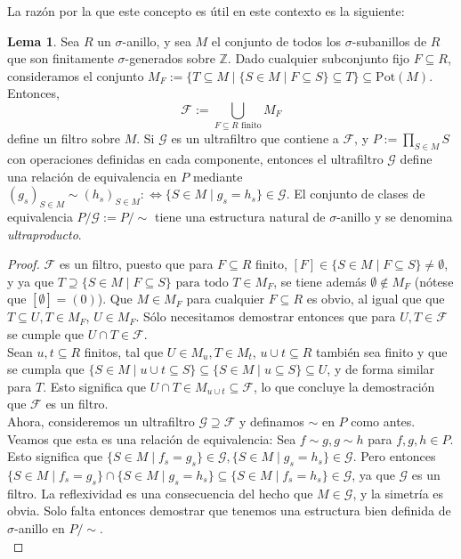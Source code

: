 \documentclass[letterpaper]{article}
\def\Z{\mathbb{Z}}
\def\fa{\text{ para todo }}
\def\s{\sigma}
\theoremstyle{definition}
\newtheorem{lem}[Satz]{Lema}
\begin{document}
La raz\'on por la que este concepto es \'util en este contexto es la siguiente:

\begin{lem}\label{lemmafilters}
Sea $R$ un $\sigma$-anillo, y sea $M$ el conjunto de todos los $\sigma$-subanillos de $R$ que son finitamente $\s$-generados sobre $\Z$. Dado cualquier subconjunto fijo $F \subseteq R$, consideramos el conjunto $M_F:= \{ T \subseteq M \mid \{S \in M \mid F \subseteq S \} \subseteq T \} \subseteq \text{Pot}(M)$. Entonces, \[ \mathcal{F}:= \bigcup_{ F \subseteq R \text{ finito} } M_F \]
 define un filtro sobre $M$. Si $\mathcal{G}$ es un ultrafiltro que contiene a $\mathcal{F}$, y $P:= \prod_{S \in M} S$ con operaciones definidas en cada componente,
 entonces el ultrafiltro $\mathcal{G}$ define una relaci\'on de equivalencia en $P$ mediante $(g_s)_{S \in M} \sim (h_s)_{S \in M} : \Leftrightarrow \{ S \in M \mid g_s = h_s \} \in \mathcal{G}$. 
El conjunto de clases de equivalencia $P/\mathcal{G}:= P/\sim$ tiene una estructura natural de $\sigma$-anillo y se denomina \emph{ultraproducto}. %
\begin{proof}
$\mathcal{F}$ es un filtro, puesto que para $F \subseteq R$ finito, $[F] \in \{ S \in M \mid F \subseteq S \} \neq \emptyset$, y ya que $T \supseteq \{ S \in M \mid F \subseteq S \} \fa T \in M_F$, se tiene adem\'as $\emptyset \notin M_F$ (n\'otese que $[\emptyset] = (0)$).
  Que $M \in M_F$ para cualquier $F \subseteq R$ es obvio, al igual que que $T \subseteq U, T \in M_F$, $U \in M_F$. S\'olo necesitamos demostrar entonces que para $U,T \in \mathcal{F}$ se cumple que $U \cap T \in \mathcal{F}$.\\
	
  Sean $u, t \subseteq R$ finitos, tal que $U \in M_u, T \in M_t$, $u \cup t \subseteq R$ tambi\'en sea finito y que se cumpla que $\{ S \in M \mid u \cup t \subseteq S \} \subseteq \{ S \in M \mid u \subseteq S \} \subseteq U$,
 y de forma similar para $T$. Esto significa que $U \cap T \in M_{u \cup t} \subseteq \mathcal{F}$, lo que concluye la demostraci\'on que $\mathcal{F}$ es un filtro.\\

 Ahora, consideremos un ultrafiltro $\mathcal{G} \supseteq \mathcal{F}$ y definamos $\sim$ en $P$ como antes. Veamos que esta es una relaci\'on de equivalencia: Sea $f \sim g, g \sim h$ para $f,g,h \in P$. 
 Esto significa que  $\{ S \in M \mid f_s = g_s \} \in \mathcal{G}, \{ S \in M \mid g_s = h_s \} \in \mathcal{G}$. Pero entonces $\{ S \in M \mid f_s = g_s \} \cap \{ S \in M \mid g_s = h_s \} \subseteq \{ S \in M \mid f_s = h_s \} \in \mathcal{G}$, ya que  $\mathcal{G}$ es un filtro.
 La reflexividad es una consecuencia del hecho que $M \in \mathcal{G}$, y la simetr\'ia es obvia. Solo falta entonces demostrar que tenemos una estructura bien definida de $\sigma$-anillo en $P/ \sim$.\\


\end{proof}
\end{lem}
\end{document}
